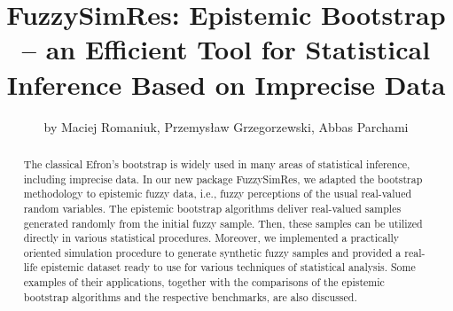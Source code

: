 \title{FuzzySimRes: Epistemic Bootstrap -- an Efficient Tool for Statistical Inference Based on Imprecise Data}
\author{by Maciej Romaniuk, Przemys{\l}aw Grzegorzewski, Abbas Parchami}
\maketitle
\begin{abstract}
The classical Efron's bootstrap is widely used in many areas of statistical inference, including imprecise data. In our new package FuzzySimRes, we adapted the bootstrap methodology to epistemic fuzzy data, i.e., fuzzy perceptions of the usual real-valued random variables. The epistemic bootstrap algorithms deliver real-valued samples generated randomly from the initial fuzzy sample. Then, these samples can be utilized directly in various statistical procedures. Moreover, we implemented a practically oriented simulation procedure to generate synthetic fuzzy samples and provided a real-life epistemic dataset ready to use for various techniques of statistical analysis. Some examples of their applications, together with the comparisons of the epistemic bootstrap algorithms and the respective benchmarks, are also discussed.
\end{abstract}
